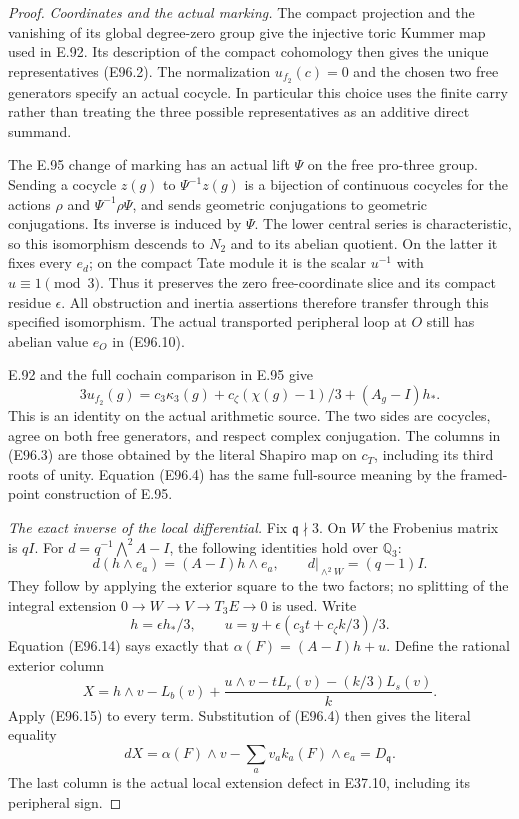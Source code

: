\begin{proof}
\emph{Coordinates and the actual marking.}
The compact projection and the vanishing of its global
degree-zero group give the injective toric Kummer map
used in E.92. Its description of the compact cohomology
then gives the unique representatives (E96.2). The
normalization $u_{f_2}(c)=0$ and the chosen two free
generators specify an actual cocycle. In particular this
choice uses the finite carry rather than treating the
three possible representatives as an additive direct
summand.

The E.95 change of marking has an actual lift $\Psi$
on the free pro-three group. Sending a cocycle $z(g)$
to $\Psi^{-1}z(g)$ is a bijection of continuous cocycles
for the actions $\rho$ and $\Psi^{-1}\rho\Psi$, and sends
geometric conjugations to geometric conjugations. Its
inverse is induced by $\Psi$. The lower central series
is characteristic, so this isomorphism descends to
$N_2$ and to its abelian quotient. On the latter it
fixes every $e_d$; on the compact Tate module it is the
scalar $u^{-1}$ with $u\equiv1\pmod3$. Thus it preserves
the zero free-coordinate slice and its compact residue
$\epsilon$. All obstruction and inertia assertions
therefore transfer through this specified isomorphism.
The actual transported peripheral loop at $O$ still
has abelian value $e_O$ in (E96.10).

E.92 and the full cochain comparison in E.95 give
\[
 3u_{f_2}(g)=c_3\kappa_3(g)
       +c_\zeta(\chi(g)-1)/3+(A_g-I)h_*.
 \tag{E96.14}
\]
This is an identity on the actual arithmetic source.
The two sides are cocycles, agree on both free
generators, and respect complex conjugation. The
columns in (E96.3) are those obtained by the literal
Shapiro map on $c_T$, including its third roots of
unity. Equation (E96.4) has the same full-source
meaning by the framed-point construction of E.95.

\emph{The exact inverse of the local differential.}
Fix $\mathfrak q\nmid3$. On $W$ the Frobenius matrix
is $qI$. For $d=q^{-1}\bigwedge^2A-I$, the following
identities hold over $\mathbb Q_3$:
\[
 d(h\wedge e_a)=(A-I)h\wedge e_a,
 \qquad d|_{\wedge^2W}=(q-1)I.
 \tag{E96.15}
\]
They follow by applying the exterior square to the
two factors; no splitting of the integral extension
$0\to W\to V\to T_3E\to0$ is used.
Write
\[
 h=\epsilon h_*/3,\qquad
 u=y+\epsilon(c_3t+c_\zeta k/3)/3.
 \tag{E96.16}
\]
Equation (E96.14) says exactly that
$\alpha(F)=(A-I)h+u$. Define the rational exterior column
\[
 X=h\wedge v-L_b(v)
          +\frac{u\wedge v-tL_r(v)-(k/3)L_s(v)}{k}.
 \tag{E96.17}
\]
Apply (E96.15) to every term. Substitution of (E96.4)
then gives the literal equality
\[
 dX=\alpha(F)\wedge v
          -\sum_av_a k_a(F)\wedge e_a
       =D_{\mathfrak q}.
 \tag{E96.18}
\]
The last column is the actual local extension defect
in E37.10, including its peripheral sign.


\end{proof}
